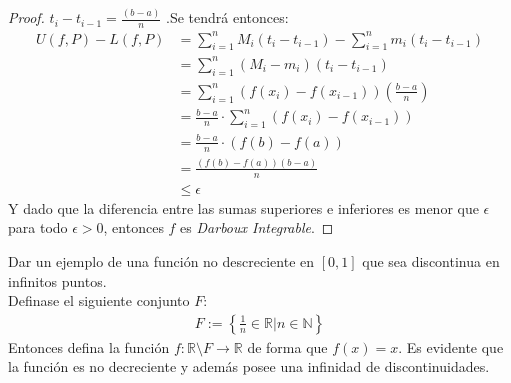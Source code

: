 \documentclass[../../main.tex]{subfiles}
\begin{document}
\begin{partes}
\begin{proof}
        $t_i - t_{i-1} = \frac{(b-a)}{n}$ .Se tendrá entonces:
        \begin{align*}
            U(f, P) - L(f, P) &= \sum_{i = 1}^n M_i (t_i - t_{i-1}) - \sum_{i = 1}^n m_i(t_i - t_{i-1})\\
            &= \sum_{i = 1}^n (M_i - m_i)(t_i - t_{i-1})\\
            &= \sum_{i = 1}^n (f(x_i) - f(x_{i-1}))(\frac{b-a}{n})\\
            &= \frac{b-a}{n} \cdot \sum_{i = 1}^n (f(x_i) - f(x_{i-1}))\\
            &= \frac{b-a}{n} \cdot (f(b)-f(a))\\
            &= \frac{(f(b)-f(a))(b-a)}{n}\\
            &\le \epsilon
        \end{align*}
        Y dado que la diferencia entre las sumas superiores e inferiores es menor que $\epsilon$ para todo $\epsilon > 0$,
        entonces $f$ es \textit{Darboux Integrable}. 
    \end{proof}
    \parte Dar un ejemplo de una función no descreciente en $[0, 1]$ que sea discontinua en infinitos puntos.\\
    Definase el siguiente conjunto $F$:
    \begin{align*}
        F := \left\{ \frac{1}{n} \in \mathbb{R} | n \in \mathbb{N} \right\}
    \end{align*} 
    Entonces defina la función $f: \mathbb{R} \setminus F \to \mathbb{R}$ de forma que $f(x) = x$. Es evidente que la función es
    no decreciente y además posee una infinidad de discontinuidades.
\end{partes}
\end{document}

